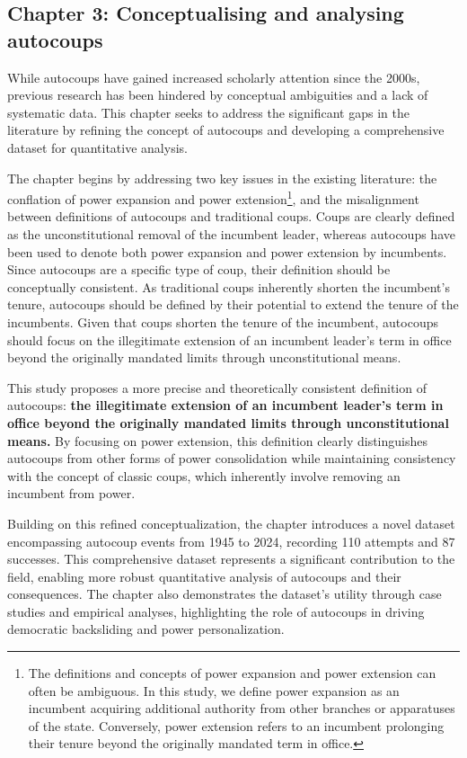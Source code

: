 \documentclass[
  12pt,
]{report}
\begin{document}
\subsection*{Chapter 3: Conceptualising and analysing
autocoups}\label{chapter-3-conceptualising-and-analysing-autocoups}

While autocoups have gained increased scholarly attention since the
2000s, previous research has been hindered by conceptual ambiguities and
a lack of systematic data. This chapter seeks to address the significant
gaps in the literature by refining the concept of autocoups and
developing a comprehensive dataset for quantitative analysis.

The chapter begins by addressing two key issues in the existing
literature: the conflation of power expansion and power
extension\footnote{The definitions and concepts of power expansion and
  power extension can often be ambiguous. In this study, we define power
  expansion as an incumbent acquiring additional authority from other
  branches or apparatuses of the state. Conversely, power extension
  refers to an incumbent prolonging their tenure beyond the originally
  mandated term in office.}, and the misalignment between definitions of
autocoups and traditional coups. Coups are clearly defined as the
unconstitutional removal of the incumbent leader, whereas autocoups have
been used to denote both power expansion and power extension by
incumbents. Since autocoups are a specific type of coup, their
definition should be conceptually consistent. As traditional coups
inherently shorten the incumbent's tenure, autocoups should be defined
by their potential to extend the tenure of the incumbents. Given that
coups shorten the tenure of the incumbent, autocoups should focus on the
illegitimate extension of an incumbent leader's term in office beyond
the originally mandated limits through unconstitutional means.

This study proposes a more precise and theoretically consistent
definition of autocoups: \textbf{the illegitimate extension of an
incumbent leader's term in office beyond the originally mandated limits
through unconstitutional means.} By focusing on power extension, this
definition clearly distinguishes autocoups from other forms of power
consolidation while maintaining consistency with the concept of classic
coups, which inherently involve removing an incumbent from power.

Building on this refined conceptualization, the chapter introduces a
novel dataset encompassing autocoup events from 1945 to 2024, recording
110 attempts and 87 successes. This comprehensive dataset represents a
significant contribution to the field, enabling more robust quantitative
analysis of autocoups and their consequences. The chapter also
demonstrates the dataset's utility through case studies and empirical
analyses, highlighting the role of autocoups in driving democratic
backsliding and power personalization.
\end{document}
